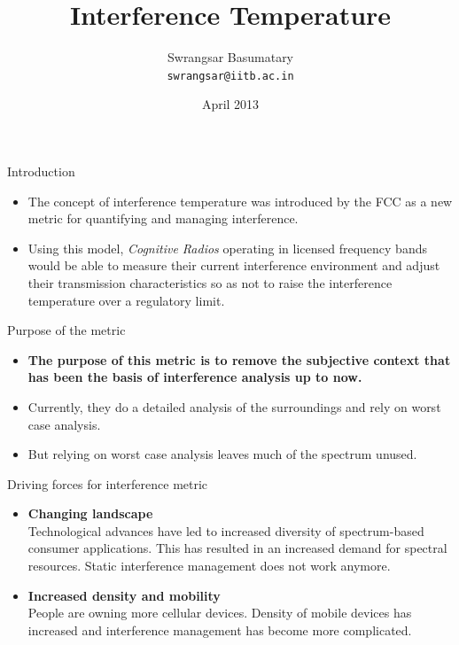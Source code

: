 \documentclass[mathserif]{beamer}
\title{Interference Temperature}
\author{Swrangsar Basumatary \\
\texttt{swrangsar@iitb.ac.in}}
\institute{Department of Electrical Engineering \\ Indian Institute of Technology Bombay}
\date{April 2013}
\begin{document}
\frame{\titlepage}



\begin{frame}{Introduction}

\begin{itemize}
	\pause
	\item The concept of interference temperature was introduced by the FCC as a new metric for quantifying and managing interference.
	\pause
	\item Using this model, \emph{Cognitive Radios} operating in licensed frequency bands would be able to measure their current interference environment and adjust their transmission characteristics so as not to raise the interference temperature over a regulatory limit.
\end{itemize}

\end{frame}



\begin{frame}{Purpose of the metric}

\begin{itemize}
	\pause 
	\item \textbf{The purpose of this metric is to remove the subjective context that has been the basis of interference analysis up to now.}
	\pause
	\item Currently, they do a  detailed analysis of the surroundings and rely on worst case analysis.
	
	
	\item But relying on worst case analysis leaves much of the spectrum unused. 
\end{itemize}

\end{frame}



\begin{frame}{Driving forces for interference metric}

\begin{itemize}
\pause
\item \textbf{Changing landscape} \\

Technological advances have led to increased diversity of spectrum-based consumer applications. This has resulted in an increased demand for spectral resources. Static interference management does not work anymore.

\pause
\item \textbf{Increased density and mobility} \\

People are owning more cellular devices. Density of mobile devices has increased and interference management has become more complicated.

\end{itemize}

\end{frame}
\end{document}
